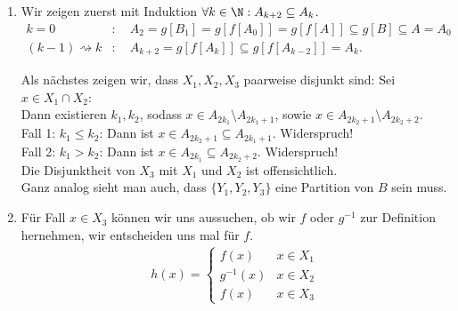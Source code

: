 \begin{solution}

\phantom{}
\begin{enumerate}[label = \alph*.]
  \item Wir zeigen zuerst mit Induktion $\forall k \in \N: A_{k+2} \subseteq A_{k}$.
  \begin{align*}
    k = 0&: \quad A_2 = g[B_1] = g[f[A_0]] = g[f[A]] \subseteq g[B] \subseteq A = A_0 \\
    (k-1) \rightsquigarrow k&: \quad
    A_{k+2} = g[f[A_{k}]] \subseteq g[f[A_{k-2}]] = A_{k}.
  \end{align*}

  Als nächstes zeigen wir, dass $X_1,X_2,X_3$ paarweise disjunkt sind:
  Sei $x \in X_1 \cap X_2$: \\
  Dann existieren $k_1, k_2$, sodass $x \in A_{2k_1}\setminus A_{2k_1+1}$, sowie
  $x \in A_{2k_2 + 1}\setminus A_{2k_2+2}$. \\
  Fall 1: $k_1 \leq k_2$: Dann ist $x \in A_{2k_2 + 1} \subseteq A_{2k_1 + 1}$. Widerspruch! \\
  Fall 2: $k_1 > k_2$: Dann ist $x \in A_{2k_1} \subseteq A_{2k_2 + 2}$. Widerspruch! \\
  Die Disjunktheit von $X_3$ mit $X_1$ und $X_2$ ist offensichtlich. \\
  Ganz analog sieht man auch, dass $\{Y_1,Y_2,Y_3\}$ eine Partition von $B$ sein muss.

  \item
  Für Fall $x \in X_3$ können wir uns aussuchen, ob wir $f$ oder $g^{-1}$
  zur Definition hernehmen, wir entscheiden uns mal für $f$.
  \begin{align*}
    h(x) = \begin{cases}
      f(x) & x \in X_1 \\
      g^{-1}(x) & x \in X_2 \\
      f(x) & x \in X_3
    \end{cases}
  \end{align*}


\end{enumerate}
\end{solution}
